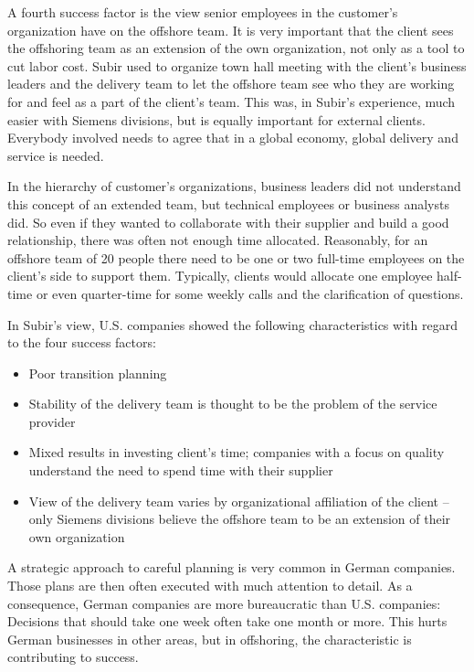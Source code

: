 A fourth success factor is the view senior employees in the customer's organization have on the offshore team. It is very important that the client sees the offshoring team as an extension of the own organization, not only as a tool to cut labor cost. Subir used to organize town hall meeting with the client's business leaders and the delivery team to let the offshore team see who they are working for and feel as a part of the client's team. This was, in Subir's experience, much easier with Siemens divisions, but is equally important for external clients. Everybody involved needs to agree that in a global economy, global delivery and service is needed.

In the hierarchy of customer's organizations, business leaders did not understand this concept of an extended team, but technical employees or business analysts did. So even if they wanted to collaborate with their supplier and build a good relationship, there was often not enough time allocated. Reasonably, for an offshore team of 20 people there need to be one or two full-time employees on the client's side to support them. Typically, clients would allocate one employee half-time or even quarter-time for some weekly calls and the clarification of questions.

In Subir's view, U.S. companies showed the following characteristics with regard to the four success factors:

\begin{itemize}
	\item Poor transition planning
	\item Stability of the delivery team is thought to be the problem of the service provider
	\item Mixed results in investing client's time; companies with a focus on quality understand the need to spend time with their supplier
	\item View of the delivery team varies by organizational affiliation of the client -- only Siemens divisions believe the offshore team to be an extension of their own organization
\end{itemize}

 A strategic approach to careful planning is very common in German companies. Those plans are then often executed with much attention to detail. As a consequence, German companies are more bureaucratic than U.S. companies: Decisions that should take one week often take one month or more. This hurts German businesses in other areas, but in offshoring, the characteristic is contributing to success.

